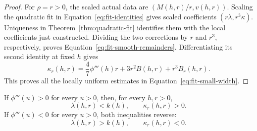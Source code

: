 \begin{proof}
For $\rho=r>0$, the scaled actual data are $(M(h,r)/r,v(h,r))$.
Scaling the quadratic fit in Equation~\eqref{eq:fit-identities} gives
scaled coefficients $(r\lambda,r^3\kappa)$.  Uniqueness in
Theorem~\ref{thm:quadratic-fit} identifies them with the local
coefficients just constructed.  Dividing the two corrections by $r$
and $r^3$, respectively, proves
Equation~\eqref{eq:fit-smooth-remainders}.  Differentiating its second
identity at fixed $h$ gives
\[
 \kappa_r(h,r)=\frac47\phi'''(h)r
                 +3r^2B(h,r)+r^3B_r(h,r).
\]
This proves all the locally uniform estimates in
Equation~\eqref{eq:fit-small-width}.
\end{proof}

\begin{proposition}\label{prop:third-derivative}
If $\phi'''(u)>0$ for every $u>0$, then, for every $h,r>0$,
\[
 \lambda(h,r)<k(h),\qquad \kappa_r(h,r)>0.
\]
If $\phi'''(u)<0$ for every $u>0$, both inequalities reverse:
\[
 \lambda(h,r)>k(h),\qquad \kappa_r(h,r)<0.
\]
\end{proposition}

